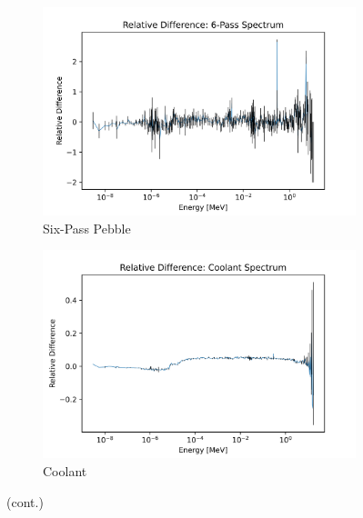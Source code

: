 \begin{figure}[H]\ContinuedFloat
\centering

\begin{subfigure}{0.95\textwidth}
  \includegraphics[width=0.95\linewidth]{figures/reldiff_six_spec}
  \caption{Six-Pass Pebble}
  \label{fig:diff-six}
\end{subfigure}%


\begin{subfigure}{0.95\textwidth}
  \includegraphics[width=0.95\linewidth]{figures/reldiff_cool_spec}
  \caption{Coolant}
  \label{fig:diff-cool}
\end{subfigure}%

\caption[]{(cont.)}
\end{figure}

